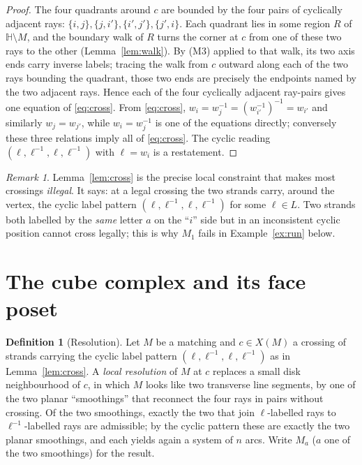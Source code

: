 \documentclass[11pt]{article}
\theoremstyle{definition}
\newtheorem{definition}{Definition}
\theoremstyle{remark}
\newtheorem{remark}{Remark}
\newcommand{\HH}{\mathbb{H}}
\begin{document}
\begin{proof}
The four quadrants around $c$ are bounded by the four pairs of cyclically
adjacent rays: $\{i,j\},\{j,i'\},\{i',j'\},\{j',i\}$. Each quadrant lies in some
region $R$ of $\HH\setminus M$, and the boundary walk of $R$ turns the corner at
$c$ from one of these two rays to the other (Lemma~\ref{lem:walk}). By (M3)
applied to that walk, its two axis ends carry inverse labels; tracing the walk
from $c$ outward along each of the two rays bounding the quadrant, those two ends
are precisely the endpoints named by the two adjacent rays. Hence each of the
four cyclically adjacent ray-pairs gives one equation of \eqref{eq:cross}. From
\eqref{eq:cross}, $w_i=w_j^{-1}=(w_{i'}^{-1})^{-1}=w_{i'}$ and similarly
$w_j=w_{j'}$, while $w_i=w_j^{-1}$ is one of the equations directly; conversely
these three relations imply all of \eqref{eq:cross}. The cyclic reading
$(\ell,\ell^{-1},\ell,\ell^{-1})$ with $\ell=w_i$ is a restatement.
\end{proof}

\begin{remark}
Lemma~\ref{lem:cross} is the precise local constraint that makes most crossings
\emph{illegal}. It says: at a legal crossing the two strands carry, around the
vertex, the cyclic label pattern $(\ell,\ell^{-1},\ell,\ell^{-1})$ for some
$\ell\in L$. Two strands both labelled by the \emph{same} letter $a$ on the
``$i$'' side but in an inconsistent cyclic position cannot cross legally; this is
why $M_1$ fails in Example~\ref{ex:run} below.
\end{remark}

\section{The cube complex and its face poset}\label{sec:cube}

\begin{definition}[Resolution]\label{def:res}
Let $M$ be a matching and $c\in X(M)$ a crossing of strands carrying the cyclic
label pattern $(\ell,\ell^{-1},\ell,\ell^{-1})$ as in Lemma~\ref{lem:cross}. A
\emph{local resolution} of $M$ at $c$ replaces a small disk neighbourhood of $c$,
in which $M$ looks like two transverse line segments, by one of the two planar
``smoothings'' that reconnect the four rays in pairs without crossing. Of the two
smoothings, exactly the two that join $\ell$-labelled rays to $\ell^{-1}$-labelled
rays are admissible; by the cyclic pattern these are exactly the two planar
smoothings, and each yields again a system of $n$ arcs. Write $M_a$ ($a$ one of
the two smoothings) for the result.
\end{definition}
\end{document}
